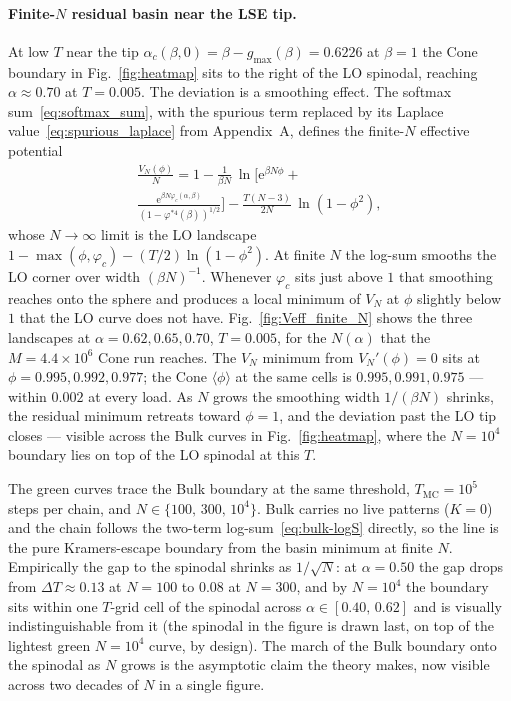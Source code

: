\documentclass[letterpaper]{article} %
\newcommand{\e}{{\mathrm{e}}}
\newcommand{\Bnet}{\beta}
\newcommand{\gmax}{g_{\max}}
\newcommand{\ac}{\alpha_c}
\begin{document}
\paragraph{Finite-$N$ residual basin near the LSE tip.}
At low $T$ near the tip $\ac(\Bnet,0) = \Bnet - \gmax(\Bnet) = 0.6226$
at $\Bnet=1$ the Cone boundary in Fig.~\ref{fig:heatmap} sits to the
right of the LO spinodal, reaching $\alpha \approx 0.70$ at
$T = 0.005$.  The deviation is a smoothing effect.  The
softmax sum~\eqref{eq:softmax_sum}, with the spurious term replaced
by its Laplace value~\eqref{eq:spurious_laplace} from Appendix~A,
defines the finite-$N$ effective potential
\begin{multline}
\frac{V_N(\phi)}{N} = 1 - \tfrac{1}{\Bnet N}\,
   \ln\!\Big[\e^{\Bnet N \phi} +\\
            \frac{\e^{\Bnet N \varphi_c(\alpha, \Bnet)}}{(1-\varphi^{*4}(\Bnet))^{1/2}} \Big]
    - \tfrac{T(N-3)}{2N}\,\ln(1 - \phi^{2}),
\label{eq:V-finite-N}
\end{multline}
whose $N \to \infty$ limit is the LO landscape
$1 - \max(\phi, \varphi_c) - (T/2)\ln(1 - \phi^2)$.  At finite $N$
the log-sum smooths the LO corner over width $(\Bnet N)^{-1}$.
Whenever $\varphi_c$ sits just above $1$ that smoothing reaches onto
the sphere and produces a local minimum of $V_N$ at $\phi$ slightly
below $1$ that the LO curve does not have.
Fig.~\ref{fig:Veff_finite_N} shows the three landscapes at
$\alpha = 0.62, 0.65, 0.70$, $T = 0.005$, for the $N(\alpha)$ that
the $M = 4.4 \times 10^6$ Cone run reaches.  The $V_N$ minimum from
$V_N'(\phi)=0$ sits at $\phi = 0.995, 0.992, 0.977$; the Cone
$\langle\phi\rangle$ at the same cells is $0.995, 0.991, 0.975$ —
within $0.002$ at every load.  As $N$ grows the smoothing width
$1/(\Bnet N)$ shrinks, the residual minimum retreats toward
$\phi=1$, and the deviation past the LO tip closes — visible
across the Bulk curves in Fig.~\ref{fig:heatmap}, where the
$N = 10^4$ boundary lies on top of the LO spinodal at this $T$.

The green curves trace the Bulk boundary at the same threshold,
$T_{\mathrm{MC}} = 10^5$ steps per chain, and
$N \in \{100,\, 300,\, 10^4\}$.  Bulk carries no live patterns ($K = 0$)
and the chain follows the two-term log-sum~\eqref{eq:bulk-logS} directly,
so the line is the pure Kramers-escape boundary from the basin minimum
at finite $N$.  Empirically the gap to the spinodal shrinks as
$1/\sqrt N$: at $\alpha = 0.50$ the gap drops from $\Delta T \approx
0.13$ at $N = 100$ to $0.08$ at $N = 300$, and by $N = 10^4$ the
boundary sits within one $T$-grid cell of the spinodal across
$\alpha \in [0.40,\, 0.62]$ and is visually indistinguishable from it
(the spinodal in the figure is drawn last, on top of the lightest green
$N = 10^4$ curve, by design).  The march of the Bulk boundary onto the
spinodal as $N$ grows is the asymptotic claim the theory makes, now
visible across two decades of $N$ in a single figure.
\end{document}
